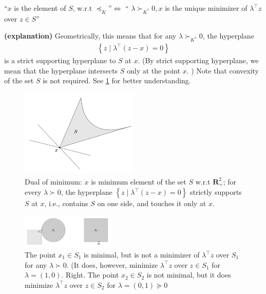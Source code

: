 \documentclass{article}
\newcommand{\bfs}[1]{\textbf{({#1}) }}
\begin{document}
\begin{lema}
  ``$x$ is the  element of $S$, w.r.t $\preceq_{K}$''$\Longleftrightarrow$  `` $\lambda \succ_{K^{*}} 0, x$ is the unique minimizer of $\lambda^{\top} z$ over $z \in S$'' 
\end{lema}
\begin{rema}{\bfs{explanation}}
Geometrically, this means that for any $\lambda \succ_{K^{*}} 0$, the hyperplane
\begin{align*}
\left\{z \mid \lambda^{\top}(z-x)=0\right\}
\end{align*}
is a strict supporting hyperplane to $S$ at $x .$ (By strict supporting hyperplane, we mean that the hyperplane intersects $S$ only at the point $x .$ ) Note that convexity of the set $S$ is not required.  See \cref{fig:duan_mini} for better understanding.
\end{rema}
\begin{figure}
    \centering
    \includegraphics[width=0.5\textwidth]{Figs/1.png}
    \caption{Dual of minimum: $x$ is minimum element of the set $S$ w.r.t $\mathbf{R}_{+}^{2}$; for every $\lambda \succ 0$, the hyperplane $\left\{z \mid \lambda^{\top}(z-x)=0\right\}$ strictly supports $S$ at $x$, i.e., contains $S$ on one side, and touches it only at $x$.}
    \label{fig:duan_mini}
\end{figure}
\begin{figure}
    \centering
    \includegraphics[width=0.4\textwidth]{Figs/7.png}
    \caption{ The point $x_{1} \in S_{1}$ is minimal, but is not a minimizer of $\lambda^{\top} z$ over $S_{1}$ for any $\lambda \succ 0$. (It does, however, minimize $\lambda^{\top} z$ over $z \in S_{1}$ for $\lambda=(1,0) .$ Right. The point $x_{2} \in S_{2}$ is not minimal, but it does minimize $\lambda^{\top} z$ over $z \in S_{2}$ for $\lambda=(0,1) \succeq 0$}
    \label{fig:duan_mini_safd}
\end{figure}
\end{document}
